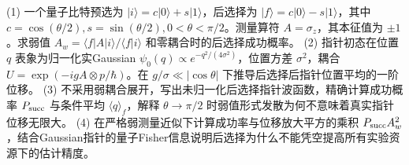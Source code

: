 (1) 一个量子比特预选为 \(|i\rangle=c|0\rangle+s|1\rangle\)，后选择为 \(|f\rangle=c|0\rangle-s|1\rangle\)，其中 \(c=\cos(\theta/2),s=\sin(\theta/2),0<\theta<\pi/2\)。测量算符 \(A=\sigma_z\)，其本征值为 \(\pm1\)。求弱值 \(A_w=\langle f|A|i\rangle/\langle f|i\rangle\) 和零耦合时的后选择成功概率。
(2) 指针初态在位置 \(q\) 表象为归一化实Gaussian \(\psi_0(q)\propto e^{-q^2/(4\sigma^2)}\)，位置方差 \(\sigma^2\)，耦合 \(U=\exp(-igA\otimes p/\hbar)\)。在 \(g/\sigma\ll|\cos\theta|\) 下推导后选择后指针位置平均的一阶位移。
(3) 不采用弱耦合展开，写出未归一化后选择指针波函数，精确计算成功概率 \(P_{\rm succ}\) 与条件平均 \(\langle q\rangle_f\)，解释 \(\theta\to\pi/2\) 时弱值形式发散为何不意味着真实指针位移无限大。
(4) 在严格弱测量近似下计算成功率与位移放大平方的乘积 \(P_{\rm succ}A_w^2\)，结合Gaussian指针的量子Fisher信息说明后选择为什么不能凭空提高所有实验资源下的估计精度。

